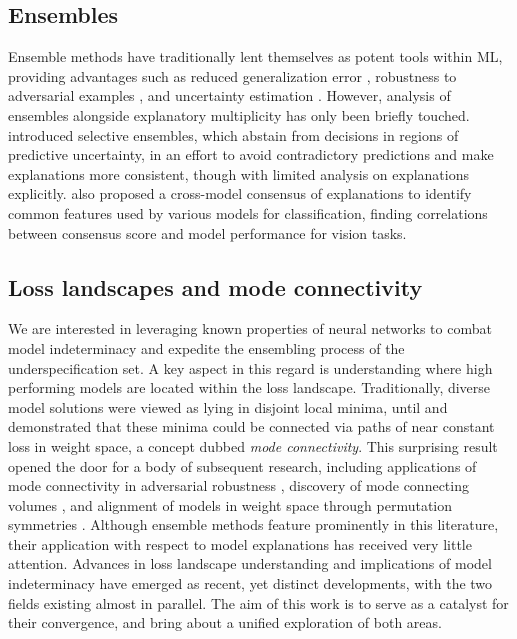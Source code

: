 
\subsection{Ensembles}

Ensemble methods have traditionally lent themselves as potent tools within ML, providing advantages such as reduced generalization error \citep{allenzhu2023, dietterich2000}, robustness to adversarial examples \citep{yang2021}, and uncertainty estimation \citep{lakshminarayanan2017}. However, analysis of ensembles alongside explanatory multiplicity has only been briefly touched. \citet{black2021selective} introduced selective ensembles, which abstain from decisions in regions of predictive uncertainty, in an effort to avoid contradictory predictions and make explanations more consistent, though with limited analysis on explanations explicitly. \citet{li2021} also proposed a cross-model consensus of explanations to identify common features used by various models for classification, finding correlations between consensus score and model performance for vision tasks.


\subsection{Loss landscapes and mode connectivity}

We are interested in leveraging known properties of neural networks to combat model indeterminacy and expedite the ensembling process of the underspecification set. A key aspect in this regard is understanding where high performing models are located within the loss landscape. Traditionally, diverse model solutions were viewed as lying in disjoint local minima, until \citet{garipov2018} and \citet{draxler2019} demonstrated that these minima could be connected via paths of near constant loss in weight space, a concept dubbed \textit{mode connectivity}. This surprising result opened the door for a body of subsequent research, including %
applications of mode connectivity in adversarial robustness \citep{zhao2020}, discovery of mode connecting volumes \citep{fort2019, benton2021}, and alignment of models in weight space through permutation symmetries \citep{ainsworth2023, singh2020, tatro2020}. Although ensemble methods feature prominently in this literature, their application with respect to model explanations has received very little attention. Advances in loss landscape understanding and implications of model indeterminacy have emerged as recent, yet distinct developments, with the two fields existing almost in parallel. The aim of this work is to serve as a catalyst for their convergence, and bring about a unified exploration of both areas.

